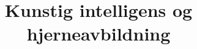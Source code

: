 \documentclass[aspectratio=169]{beamer}
\title{Kunstig intelligens og hjerneavbildning}
\begin{document}
	\begin{frame}
	 	\titlepage
	\end{frame}

    
    
    
    
\end{document}
